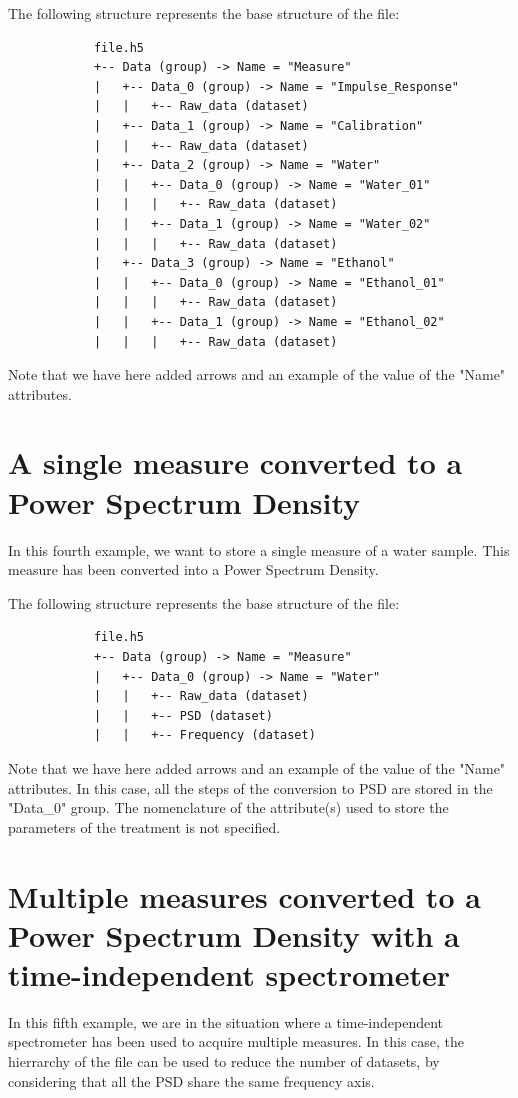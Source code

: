 \documentclass{book}
\begin{document}
        The following structure represents the base structure of the file:
        \begin{verbatim}
            file.h5
            +-- Data (group) -> Name = "Measure"
            |   +-- Data_0 (group) -> Name = "Impulse_Response"
            |   |   +-- Raw_data (dataset)
            |   +-- Data_1 (group) -> Name = "Calibration"
            |   |   +-- Raw_data (dataset)
            |   +-- Data_2 (group) -> Name = "Water"
            |   |   +-- Data_0 (group) -> Name = "Water_01"
            |   |   |   +-- Raw_data (dataset)
            |   |   +-- Data_1 (group) -> Name = "Water_02"
            |   |   |   +-- Raw_data (dataset)
            |   +-- Data_3 (group) -> Name = "Ethanol"
            |   |   +-- Data_0 (group) -> Name = "Ethanol_01"
            |   |   |   +-- Raw_data (dataset)
            |   |   +-- Data_1 (group) -> Name = "Ethanol_02"
            |   |   |   +-- Raw_data (dataset)
        \end{verbatim}
        Note that we have here added arrows and an example of the value of the "Name" attributes.
    
    \section{A single measure converted to a Power Spectrum Density}
        In this fourth example, we want to store a single measure of a water sample. This measure has been converted into a Power Spectrum Density.

        The following structure represents the base structure of the file:
        \begin{verbatim}
            file.h5
            +-- Data (group) -> Name = "Measure"
            |   +-- Data_0 (group) -> Name = "Water"
            |   |   +-- Raw_data (dataset)
            |   |   +-- PSD (dataset)
            |   |   +-- Frequency (dataset)
        \end{verbatim}
        Note that we have here added arrows and an example of the value of the "Name" attributes.
        In this case, all the steps of the conversion to PSD are stored in the "Data\_0" group. The nomenclature of the attribute(s) used to store the parameters of the treatment is not specified.
    
    \section{Multiple measures converted to a Power Spectrum Density with a time-independent spectrometer}
        In this fifth example, we are in the situation where a time-independent spectrometer has been used to acquire multiple measures. In this case, the hierrarchy of the file can be used to reduce the number of datasets, by considering that all the PSD share the same frequency axis.
\end{document}
